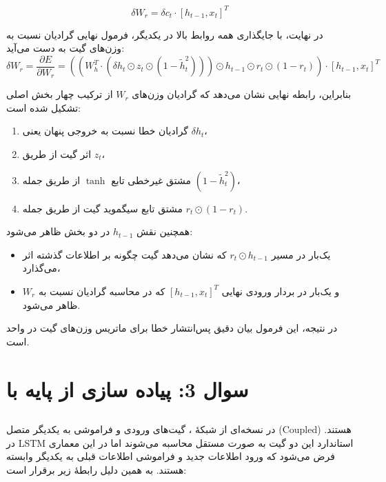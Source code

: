 \documentclass{article}
\begin{document}
\begin{equation}
	\delta W_r=\delta c_t\cdot[h_{t-1},x_t]^T
\end{equation}

در نهایت، با جایگذاری همه روابط بالا در یکدیگر، فرمول نهایی گرادیان نسبت به وزن‌های گیت  به دست می‌آید:
\begin{equation}
	\delta W_r
	=
	\frac{\partial E}{\partial W_r}
	=
	\left(
	\left(
	W_h^T\cdot
	\left(
	\delta h_t\odot z_t\odot(1-\widetilde{h}_t^2)
	\right)
	\right)
	\odot h_{t-1}
	\odot r_t
	\odot (1-r_t)
	\right)
	\cdot
	[h_{t-1},x_t]^T
\end{equation}

بنابراین، رابطه نهایی نشان می‌دهد که گرادیان وزن‌های $W_r$ از ترکیب چهار بخش اصلی تشکیل شده است:
\begin{enumerate}
	\item گرادیان خطا نسبت به خروجی پنهان یعنی $\delta h_t$،
	\item اثر گیت  از طریق $z_t$،
	\item مشتق غیرخطی تابع $\tanh$ از طریق جمله $(1-\widetilde{h}_t^2)$،
	\item مشتق تابع سیگموید گیت  از طریق جمله $r_t\odot(1-r_t)$.
\end{enumerate}

همچنین نقش $h_{t-1}$ در دو بخش ظاهر می‌شود:
\begin{itemize}
	\item یک‌بار در مسیر $r_t\odot h_{t-1}$ که نشان می‌دهد گیت  چگونه بر اطلاعات گذشته اثر می‌گذارد،
	\item و یک‌بار در بردار ورودی نهایی $[h_{t-1},x_t]^T$ که در محاسبه گرادیان نسبت به $W_r$ ظاهر می‌شود.
\end{itemize}

در نتیجه، این فرمول بیان دقیق پس‌انتشار خطا برای ماتریس وزن‌های گیت  در واحد  است.

\section{سوال 3: پیاده سازی  از پایه با }
\subsection{}

در نسخه‌ای از شبکۀ ، گیت‌های ورودی و فراموشی به یکدیگر متصل (Coupled) هستند. در LSTM استاندارد این دو گیت به صورت مستقل محاسبه می‌شوند اما در این معماری فرض می‌شود که ورود اطلاعات جدید و فراموشی اطلاعات قبلی به یکدیگر وابسته هستند. به همین دلیل رابطۀ زیر برقرار است:
\end{document}
